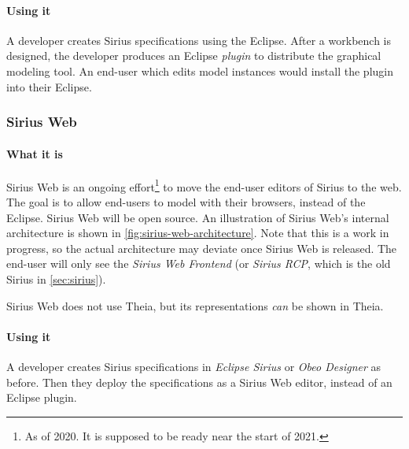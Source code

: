 \paragraph*{Using it} A developer creates Sirius specifications using the \gls{Eclipse}.
After a workbench is designed, the developer produces an Eclipse \emph{plugin} to distribute the graphical modeling tool. An end-user which edits model instances would install the plugin into their \gls{Eclipse}.


\subsubsection{Sirius Web}\label{sec:sirius-web}

\paragraph*{What it is}
Sirius Web is an ongoing effort\footnote{As of 2020. It is supposed to be ready near the start of 2021.} to move the end-user editors of Sirius to the web.
The goal is to allow end-users to model with their browsers, instead of the \gls{Eclipse}.
Sirius Web will be \gls{open source}.
An illustration of Sirius Web's internal architecture is shown in \cref{fig:sirius-web-architecture}. Note that this is a work in progress, so the actual architecture may deviate once Sirius Web is released.
The end-user will only see the \emph{Sirius Web Frontend} (or \emph{Sirius \acrshort{RCP}}, which is the old Sirius in \cref{sec:sirius}).

Sirius Web does not use Theia, but its representations \textit{can} be shown in Theia.~\cite{neilmackenzieSiriusWebXText2020}

\paragraph*{Using it} A developer creates Sirius specifications in \emph{Eclipse Sirius} or \emph{Obeo Designer} as before. 
Then they deploy the specifications as a Sirius Web editor, instead of an Eclipse plugin.

